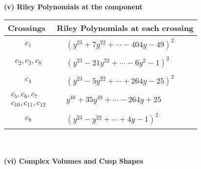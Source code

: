 \documentclass[1p]{elsarticle_modified}
\theoremstyle{definition}
\begin{document}
\newpage\renewcommand{\arraystretch}{1}
\flushleft \textbf{(v) Riley Polynomials at the component}\newline \\
\begin{tabular}{m{50pt}|m{274pt}}
Crossings & \hspace{64pt}Riley Polynomials at each crossing \\
\hline $$\begin{aligned}c_{1}\end{aligned}$$&$\begin{aligned}
&(y^{23}+7 y^{22}+\cdots-404 y-49)^{2}
\end{aligned}$\\
\hline $$\begin{aligned}c_{2},c_{3},c_{8}\end{aligned}$$&$\begin{aligned}
&(y^{23}-21 y^{22}+\cdots-6 y^2-1)^{2}
\end{aligned}$\\
\hline $$\begin{aligned}c_{4}\end{aligned}$$&$\begin{aligned}
&(y^{23}-5 y^{22}+\cdots+264 y-25)^{2}
\end{aligned}$\\
\hline $$\begin{aligned}c_{5},c_{6},c_{7}\\c_{10},c_{11},c_{12}\end{aligned}$$&$\begin{aligned}
&y^{46}+35 y^{45}+\cdots-264 y+25
\end{aligned}$\\
\hline $$\begin{aligned}c_{9}\end{aligned}$$&$\begin{aligned}
&(y^{23}- y^{22}+\cdots+4 y-1)^{2}
\end{aligned}$\\
\hline
\end{tabular}\\~\\
\newpage\flushleft \textbf{(vi) Complex Volumes and Cusp Shapes}
\end{document}
